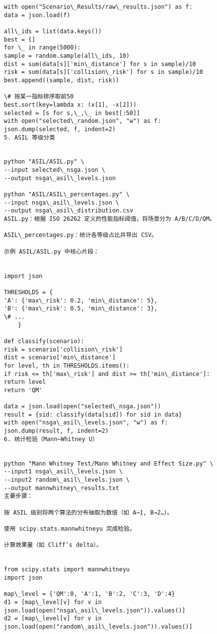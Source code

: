 \begin{lstlisting}
with open("Scenario\_Results/raw\_results.json") as f:
data = json.load(f)
  	
all\_ids = list(data.keys())
best = []
for \_ in range(5000):
sample = random.sample(all\_ids, 10)
dist = sum(data[s]['min\_distance'] for s in sample)/10
risk = sum(data[s]['collision\_risk'] for s in sample)/10
best.append((sample, dist, risk))
  	
\# 按某一指标排序取前50
best.sort(key=lambda x: (x[1], -x[2]))  
selected = [s for s,\_,\_ in best[:50]]
with open("selected\_random.json", "w") as f:
json.dump(selected, f, indent=2)
5. ASIL 等级分类
  	
  	
python "ASIL/ASIL.py" \
--input selected\_nsga.json \
--output nsga\_asil\_levels.json
  	
python "ASIL/ASIL\_percentages.py" \
--input nsga\_asil\_levels.json \
--output nsga\_asil\_distribution.csv
ASIL.py：根据 ISO 26262 定义的性能指标阈值，将场景分为 A/B/C/D/QM。
  	
ASIL\_percentages.py：统计各等级占比并导出 CSV。
  	
示例 ASIL/ASIL.py 中核心片段：
  	
  	
import json
  	
THRESHOLDS = {
'A': {'max\_risk': 0.2, 'min\_distance': 5},
'B': {'max\_risk': 0.5, 'min\_distance': 3},
\# ...
  	}
  	
def classify(scenario):
risk = scenario['collision\_risk']
dist = scenario['min\_distance']
for level, th in THRESHOLDS.items():
if risk <= th['max\_risk'] and dist >= th['min\_distance']:
return level
return 'QM'
  	
data = json.load(open("selected\_nsga.json"))
result = {sid: classify(data[sid]) for sid in data}
with open("nsga\_asil\_levels.json", "w") as f:
json.dump(result, f, indent=2)
6. 统计检验（Mann–Whitney U）
  	
  	
python "Mann Whitney Test/Mann Whitney and Effect Size.py" \
--input1 nsga\_asil\_levels.json \
--input2 random\_asil\_levels.json \
--output mannwhitney\_results.txt
主要步骤：
  	
按 ASIL 级别将两个算法的分布抽取为数值（如 A→1, B→2…）。
  	
使用 scipy.stats.mannwhitneyu 完成检验。
  	
计算效果量（如 Cliff’s delta）。
  	
  	
from scipy.stats import mannwhitneyu
import json
  	
map\_level = {'QM':0, 'A':1, 'B':2, 'C':3, 'D':4}
d1 = [map\_level[v] for v in json.load(open("nsga\_asil\_levels.json")).values()]
d2 = [map\_level[v] for v in json.load(open("random\_asil\_levels.json")).values()]
  	

\end{lstlisting}

